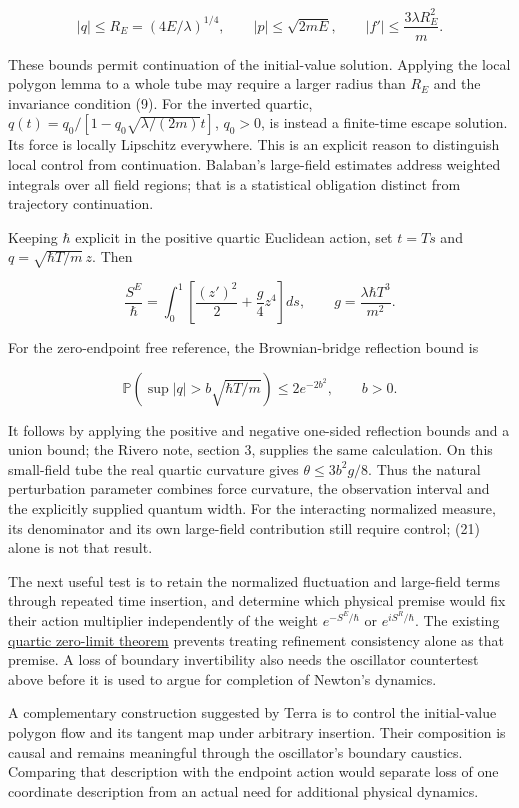 \documentclass[11pt,a4paper]{article}
\begin{document}
\[
 |q|\le R_E=(4E/\lambda)^{1/4},\qquad
 |p|\le\sqrt{2mE},\qquad
 |f'|\le\frac{3\lambda R_E^2}{m}.
 \tag{19}
\]

These bounds permit continuation of the initial-value solution. Applying
the local polygon lemma to a whole tube may require a larger radius than
\(R_E\) and the invariance condition (9). For the inverted quartic,
\(q(t)=q_0/[1-q_0\sqrt{\lambda/(2m)}t]\), \(q_0>0\), is instead a
finite-time escape solution. Its force is locally Lipschitz everywhere.
This is an explicit reason to distinguish local control from
continuation. Balaban's large-field estimates address weighted integrals
over all field regions; that is a statistical obligation distinct from
trajectory continuation.

Keeping \(\hbar\) explicit in the positive quartic Euclidean action, set
\(t=Ts\) and \(q=\sqrt{\hbar T/m}\,z\). Then

\[
 \frac{S^E}{\hbar}
 =\int_0^1\left[\frac{(z')^2}{2}+\frac g4z^4\right]ds,
 \qquad g=\frac{\lambda\hbar T^3}{m^2}.
 \tag{20}
\]

For the zero-endpoint free reference, the Brownian-bridge reflection
bound is

\[
 \mathbb P\!\left(\sup|q|>b\sqrt{\hbar T/m}\right)
       \le2e^{-2b^2},\qquad b>0.
 \tag{21}
\]

It follows by applying the positive and negative one-sided reflection
bounds and a union bound; the Rivero note, section 3, supplies the same
calculation. On this small-field tube the real quartic curvature gives
\(\theta\le3b^2g/8\). Thus the natural perturbation parameter combines
force curvature, the observation interval and the explicitly supplied
quantum width. For the interacting normalized measure, its denominator
and its own large-field contribution still require control; (21) alone
is not that result.

The next useful test is to retain the normalized fluctuation and
large-field terms through repeated time insertion, and determine which
physical premise would fix their action multiplier independently of the
weight \(e^{-S^E/\hbar}\) or \(e^{iS^R/\hbar}\). The existing
\href{rivero-1998-conjecture-central-forces.md}{quartic zero-limit
theorem} prevents treating refinement consistency alone as that premise.
A loss of boundary invertibility also needs the oscillator countertest
above before it is used to argue for completion of Newton's dynamics.

A complementary construction suggested by Terra is to control the
initial-value polygon flow and its tangent map under arbitrary
insertion. Their composition is causal and remains meaningful through
the oscillator's boundary caustics. Comparing that description with the
endpoint action would separate loss of one coordinate description from
an actual need for additional physical dynamics.
\end{document}

